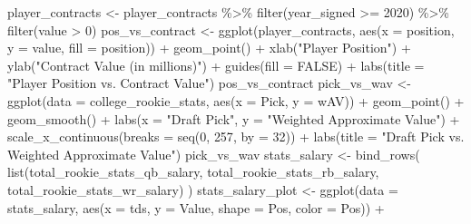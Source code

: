 \documentclass[
  letterpaper,
  DIV=11,
  numbers=noendperiod]{scrartcl}
\newenvironment{Shaded}{\begin{snugshade}}{\end{snugshade}}
\newcommand{\AttributeTok}[1]{\textcolor[rgb]{0.40,0.45,0.13}{#1}}
\newcommand{\ConstantTok}[1]{\textcolor[rgb]{0.56,0.35,0.01}{#1}}
\newcommand{\DecValTok}[1]{\textcolor[rgb]{0.68,0.00,0.00}{#1}}
\newcommand{\FunctionTok}[1]{\textcolor[rgb]{0.28,0.35,0.67}{#1}}
\newcommand{\NormalTok}[1]{\textcolor[rgb]{0.00,0.23,0.31}{#1}}
\newcommand{\OtherTok}[1]{\textcolor[rgb]{0.00,0.23,0.31}{#1}}
\newcommand{\SpecialCharTok}[1]{\textcolor[rgb]{0.37,0.37,0.37}{#1}}
\newcommand{\StringTok}[1]{\textcolor[rgb]{0.13,0.47,0.30}{#1}}
\begin{document}
\begin{Shaded}
\begin{Highlighting}[]
\NormalTok{player\_contracts }\OtherTok{\textless{}{-}}\NormalTok{ player\_contracts }\SpecialCharTok{\%\textgreater{}\%}
  \FunctionTok{filter}\NormalTok{(year\_signed }\SpecialCharTok{\textgreater{}=} \DecValTok{2020}\NormalTok{) }\SpecialCharTok{\%\textgreater{}\%}
  \FunctionTok{filter}\NormalTok{(value }\SpecialCharTok{\textgreater{}} \DecValTok{0}\NormalTok{)}
\NormalTok{pos\_vs\_contract }\OtherTok{\textless{}{-}} \FunctionTok{ggplot}\NormalTok{(player\_contracts,}
                          \FunctionTok{aes}\NormalTok{(}\AttributeTok{x =}\NormalTok{ position, }\AttributeTok{y =}\NormalTok{ value, }\AttributeTok{fill =}\NormalTok{ position)) }\SpecialCharTok{+}
  \FunctionTok{geom\_point}\NormalTok{() }\SpecialCharTok{+}
  \FunctionTok{xlab}\NormalTok{(}\StringTok{"Player Position"}\NormalTok{) }\SpecialCharTok{+}
  \FunctionTok{ylab}\NormalTok{(}\StringTok{"Contract Value (in millions)"}\NormalTok{) }\SpecialCharTok{+}
  \FunctionTok{guides}\NormalTok{(}\AttributeTok{fill =} \ConstantTok{FALSE}\NormalTok{) }\SpecialCharTok{+}
  \FunctionTok{labs}\NormalTok{(}\AttributeTok{title =} \StringTok{"Player Position vs. Contract Value"}\NormalTok{)}
\NormalTok{pos\_vs\_contract}
\NormalTok{pick\_vs\_wav }\OtherTok{\textless{}{-}} \FunctionTok{ggplot}\NormalTok{(}\AttributeTok{data =}\NormalTok{ college\_rookie\_stats, }\FunctionTok{aes}\NormalTok{(}\AttributeTok{x =}\NormalTok{ Pick, }\AttributeTok{y =}\NormalTok{ wAV)) }\SpecialCharTok{+} 
  \FunctionTok{geom\_point}\NormalTok{() }\SpecialCharTok{+} 
  \FunctionTok{geom\_smooth}\NormalTok{() }\SpecialCharTok{+}
  \FunctionTok{labs}\NormalTok{(}\AttributeTok{x =} \StringTok{"Draft Pick"}\NormalTok{, }\AttributeTok{y =} \StringTok{"Weighted Approximate Value"}\NormalTok{) }\SpecialCharTok{+}
  \FunctionTok{scale\_x\_continuous}\NormalTok{(}\AttributeTok{breaks =} \FunctionTok{seq}\NormalTok{(}\DecValTok{0}\NormalTok{, }\DecValTok{257}\NormalTok{, }\AttributeTok{by =} \DecValTok{32}\NormalTok{)) }\SpecialCharTok{+}
  \FunctionTok{labs}\NormalTok{(}\AttributeTok{title =} \StringTok{"Draft Pick vs. Weighted Approximate Value"}\NormalTok{)}
\NormalTok{pick\_vs\_wav}
\NormalTok{stats\_salary }\OtherTok{\textless{}{-}} \FunctionTok{bind\_rows}\NormalTok{(}
  \FunctionTok{list}\NormalTok{(total\_rookie\_stats\_qb\_salary, total\_rookie\_stats\_rb\_salary, total\_rookie\_stats\_wr\_salary)}
\NormalTok{)}
\NormalTok{stats\_salary\_plot }\OtherTok{\textless{}{-}} \FunctionTok{ggplot}\NormalTok{(}\AttributeTok{data =}\NormalTok{ stats\_salary,}
       \FunctionTok{aes}\NormalTok{(}\AttributeTok{x =}\NormalTok{ tds, }\AttributeTok{y =}\NormalTok{ Value, }\AttributeTok{shape =}\NormalTok{ Pos, }\AttributeTok{color =}\NormalTok{ Pos)) }\SpecialCharTok{+} 

\end{Highlighting}
\end{Shaded}
\end{document}
